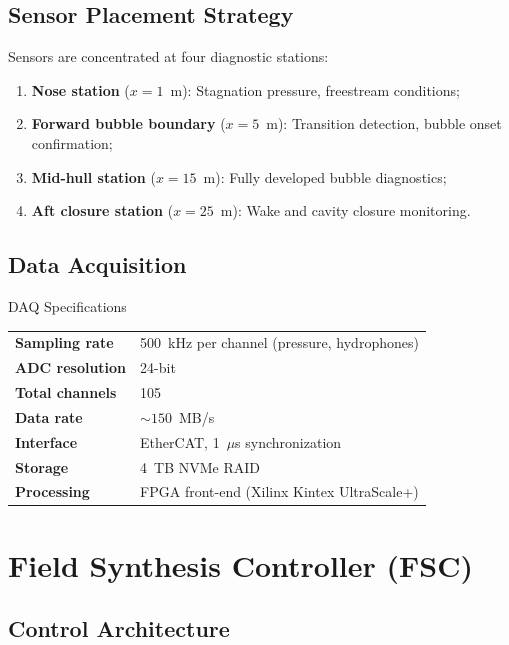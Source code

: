 \documentclass[11pt]{article}
\begin{document}
\subsection{Sensor Placement Strategy}

Sensors are concentrated at four diagnostic stations:
\begin{enumerate}[noitemsep]
\item \textbf{Nose station} ($x = 1$~m): Stagnation pressure, freestream
  conditions;
\item \textbf{Forward bubble boundary} ($x = 5$~m): Transition detection,
  bubble onset confirmation;
\item \textbf{Mid-hull station} ($x = 15$~m): Fully developed bubble
  diagnostics;
\item \textbf{Aft closure station} ($x = 25$~m): Wake and cavity closure
  monitoring.
\end{enumerate}

\subsection{Data Acquisition}

\begin{specbox}{DAQ Specifications}
\begin{tabular}{@{}ll@{}}
\textbf{Sampling rate} & 500~kHz per channel (pressure, hydrophones) \\
\textbf{ADC resolution} & 24-bit \\
\textbf{Total channels} & 105 \\
\textbf{Data rate} & $\sim 150$~MB/s \\
\textbf{Interface} & EtherCAT, 1~$\mu$s synchronization \\
\textbf{Storage} & 4~TB NVMe RAID \\
\textbf{Processing} & FPGA front-end (Xilinx Kintex UltraScale+) \\
\end{tabular}
\end{specbox}

\section{Field Synthesis Controller (FSC)}
\label{sec:fsc}

\subsection{Control Architecture}
\end{document}
